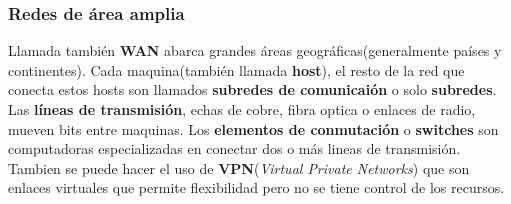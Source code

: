 \documentclass[
	12pt, %
	fleqn, %
	a4paper, %
	oneside, %
]{LegrandOrangeBook}
\begin{document}
\subsubsection{Redes de área amplia}
Llamada también \textbf{WAN} abarca grandes áreas geográficas(generalmente países y continentes). Cada maquina(también llamada \textbf{host}), el resto de la red que conecta estos hosts son llamados \textbf{subredes de comunicaión} o solo \textbf{subredes}. Las \textbf{líneas de transmisión}, echas de cobre, fibra optica o enlaces de radio, mueven bits entre maquinas. Los \textbf{elementos de conmutación} o \textbf{switches} son computadoras especializadas en conectar dos o más lineas de transmisión. Tambien se puede hacer el uso de \textbf{VPN}(\textit{Virtual Private Networks}) que son enlaces virtuales que permite flexibilidad pero no se tiene control de los recursos.
\end{document}
